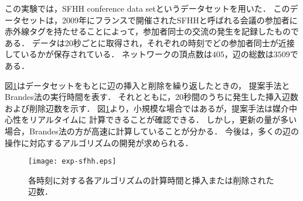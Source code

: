 この実験では，SFHH conference data set\cite{Genois2018}というデータセットを用いた．
このデータセットは，2009年にフランスで開催されたSFHHと呼ばれる会議の参加者に
赤外線タグを持たせることによって，参加者同士の交流の発生を記録したものである．
データは20秒ごとに取得され，それぞれの時刻でどの参加者同士が近接しているかが保存されている．
ネットワークの頂点数は$405$，辺の総数は$3509$である．

図\ref{fig:exp-sfhh}はデータセットをもとに辺の挿入と削除を繰り返したときの，
提案手法とBrandes法の実行時間を表す．
それとともに，20秒間のうちに発生した挿入辺数および削除辺数を示す．
図\ref{fig:exp-sfhh}より，小規模な場合ではあるが，提案手法は媒介中心性をリアルタイムに
計算できることが確認できる．
しかし，更新の量が多い場合，Brandes法の方が高速に計算していることが分かる．
今後は，多くの辺の操作に対応するアルゴリズムの開発が求められる．

\begin{figure}[tb]
  \centering
  \texttt{[image: exp-sfhh.eps]}
  \caption{各時刻に対する各アルゴリズムの計算時間と挿入または削除された辺数．}
  \label{fig:exp-sfhh}
\end{figure}
